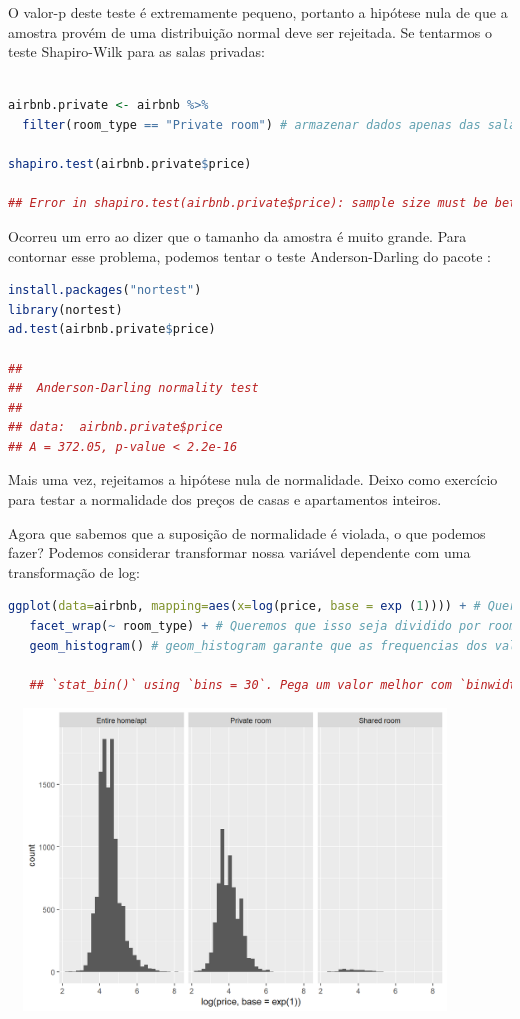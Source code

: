 \documentclass{article}
\begin{document}
O valor-p deste teste é extremamente pequeno, portanto a hipótese nula de que a amostra provém de uma distribuição normal deve ser rejeitada. Se tentarmos o teste Shapiro-Wilk para as salas privadas:

\begin{lstlisting}[language=R]

airbnb.private <- airbnb %>% 
  filter(room_type == "Private room") # armazenar dados apenas das salas compartilhadas
  
shapiro.test(airbnb.private$price)

## Error in shapiro.test(airbnb.private$price): sample size must be between 3 and 5000
\end{lstlisting}

Ocorreu um erro ao dizer que o tamanho da amostra é muito grande. Para contornar esse problema, podemos tentar o teste Anderson-Darling do pacote :

\newpage
\begin{lstlisting}[language=R]
install.packages("nortest")
library(nortest)
ad.test(airbnb.private$price)

## 
##  Anderson-Darling normality test
## 
## data:  airbnb.private$price
## A = 372.05, p-value < 2.2e-16
\end{lstlisting}

Mais uma vez, rejeitamos a hipótese nula de normalidade. Deixo como exercício para testar a normalidade dos preços de casas e apartamentos inteiros.

Agora que sabemos que a suposição de normalidade é violada, o que podemos fazer? Podemos considerar transformar nossa variável dependente com uma transformação de log:

\begin{lstlisting}[language=R]
ggplot(data=airbnb, mapping=aes(x=log(price, base = exp (1)))) + # Queremos o preco transformado em log no eixo X.
   facet_wrap(~ room_type) + # Queremos que isso seja dividido por room_type. Facet_wrap garantira que o ggplot crie paineis diferentes no seu grafico.
   geom_histogram() # geom_histogram garante que as frequencias dos valores no eixo X sejam plotadas.
   
   ## `stat_bin()` using `bins = 30`. Pega um valor melhor com `binwidth`.
\end{lstlisting}

\begin{center}
\includegraphics[width=12cm,height=8cm]{modelling_logtransform-1.png} 
\end{center}
\end{document}
